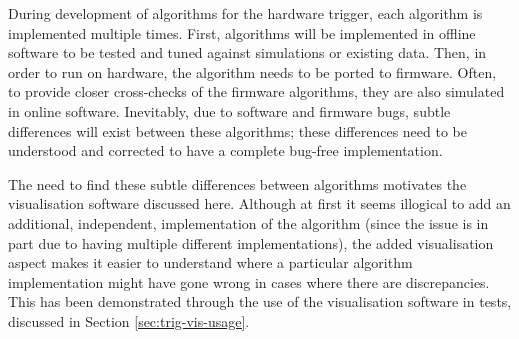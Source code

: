 During development of algorithms for the hardware trigger, each algorithm is
implemented multiple times. First, algorithms will be implemented in offline
software to be tested and tuned against simulations or existing data. Then, in
order to run on hardware, the algorithm needs to be ported to firmware. Often, to
provide closer cross-checks of the firmware algorithms, they are also simulated
in online software. Inevitably, due to software and firmware bugs, subtle
differences will exist between these algorithms; these differences need to be
understood and corrected to have a complete bug-free implementation.

The need to find these subtle differences between algorithms motivates the
visualisation software discussed here. Although at first it seems illogical to
add an additional, independent, implementation of the algorithm (since the issue
is in part due to having multiple different implementations), the added
visualisation aspect makes it easier to understand where a particular algorithm
implementation might have gone wrong in cases where there are discrepancies.
This has been demonstrated through the use of the visualisation software in
tests, discussed in Section \ref{sec:trig-vis-usage}.

